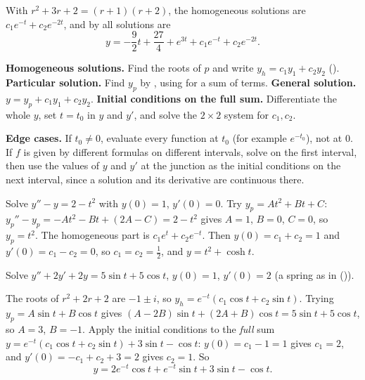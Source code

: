 \documentclass[10pt]{scrartcl}
\newenvironment{howto}[1]{\begin{mdframed}[style=howtostyle,frametitle={#1}]}{\end{mdframed}}
\begin{document}
\revisit[ (part 2)] With $r^2+3r+2=(r+1)(r+2)$, the homogeneous solutions are $c_1e^{-t}+c_2e^{-2t}$, and by  all solutions are
\[
  y = -\frac92 t + \frac{27}{4} + e^{3t} + c_1e^{-t} + c_2e^{-2t}.
\]

\begin{howto}{How to solve an IVP $L[y]=f$, $y(t_0)=Y_0$, $y'(t_0)=Y_1$}
  \begin{steps}
    \ii \textbf{Homogeneous solutions.} Find the roots of $p$ and write $y_h=c_1y_1+c_2y_2$ ().
    \ii \textbf{Particular solution.} Find $y_p$ by , using  for a sum of terms.
    \ii \textbf{General solution.} $y=y_p+c_1y_1+c_2y_2$.
    \ii \textbf{Initial conditions on the full sum.} Differentiate the whole $y$, set $t=t_0$ in $y$ and $y'$, and solve the $2\times 2$ system for $c_1,c_2$.
  \end{steps}
  \textbf{Edge cases.} If $t_0\neq 0$, evaluate every function at $t_0$ (for example $e^{-t_0}$), not at $0$. If $f$ is given by different formulas on different intervals, solve on the first interval, then use the values of $y$ and $y'$ at the junction as the initial conditions on the next interval, since a solution and its derivative are continuous there.
\end{howto}

\begin{example*}
  Solve $y''-y=2-t^2$ with $y(0)=1$, $y'(0)=0$. Try $y_p=At^2+Bt+C$: $y_p''-y_p=-At^2-Bt+(2A-C)=2-t^2$ gives $A=1$, $B=0$, $C=0$, so $y_p=t^2$. The homogeneous part is $c_1e^t+c_2e^{-t}$. Then $y(0)=c_1+c_2=1$ and $y'(0)=c_1-c_2=0$, so $c_1=c_2=\frac12$, and $y=t^2+\cosh t$.
\end{example*}

\begin{example*}
  Solve $y''+2y'+2y=5\sin t+5\cos t$, $y(0)=1$, $y'(0)=2$ (a spring as in ()).
  \begin{steps}
    \ii The roots of $r^2+2r+2$ are $-1\pm i$, so $y_h=e^{-t}(c_1\cos t+c_2\sin t)$.
    \ii Trying $y_p=A\sin t+B\cos t$ gives $(A-2B)\sin t+(2A+B)\cos t=5\sin t+5\cos t$, so $A=3$, $B=-1$.
    \ii Apply the initial conditions to the \emph{full} sum $y=e^{-t}(c_1\cos t+c_2\sin t)+3\sin t-\cos t$: $y(0)=c_1-1=1$ gives $c_1=2$, and $y'(0)=-c_1+c_2+3=2$ gives $c_2=1$. So
    \[
      y = 2e^{-t}\cos t + e^{-t}\sin t + 3\sin t - \cos t.
    \]
  \end{steps}
\end{example*}
\end{document}
